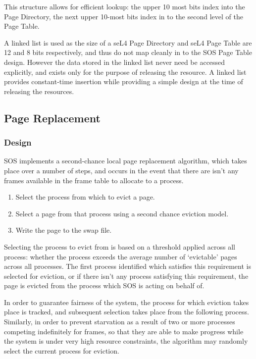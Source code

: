 \documentclass[a4paper,12pt]{article}
\begin{document}
This structure allows for efficient lookup: the upper 10 most bits index into
the Page Directory, the next upper 10-most bits index in to the second level
of the Page Table.

A linked list is used as the size of a seL4 Page Directory and seL4 Page Table
are 12 and 8 bits respectively, and thus do not map cleanly in to the SOS Page
Table design.  However the data stored in the linked list never need be
accessed explicitly, and exists only for the purpose of releasing the
resource.  A linked list provides constant-time insertion while providing a
simple design at the time of releasing the resources.

\subsection{Page Replacement}
\subsubsection{Design}
SOS implements a second-chance local page replacement algorithm, which takes
place over a number of steps, and occurs in the event that there are isn't any
frames available in the frame table to allocate to a process.

\begin{enumerate}
\item Select the process from which to evict a page.
\item Select a page from that process using a second chance eviction model.
\item Write the page to the swap file.
\end{enumerate}

Selecting the process to evict from is based on a threshold applied across all
process: whether the process exceeds the average number of `evictable' pages
across all processes.  The first process identified which satisfies this
requirement is selected for eviction, or if there isn't any process satisfying
this requirement, the page is evicted from the process which SOS is acting on
behalf of.

In order to guarantee fairness of the system, the process for which eviction
takes place is tracked, and subsequent selection takes place from the
following process.  Similarly, in order to prevent starvation as a result of
two or more processes competing indefinitely for frames, so that they are able
to make progress while the system is under very high resource constraints, the
algorithm may randomly select the current process for eviction.
\end{document}
